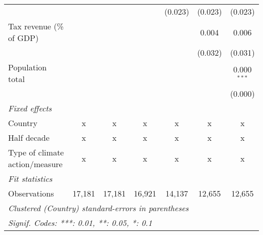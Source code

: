 \begin{tabular}{lcccccc}
                                                     &             &             &             & (0.023)        & (0.023)        & (0.023)\\   
   Tax revenue (\% of GDP)                           &             &             &             &                & 0.004          & 0.006\\   
                                                     &             &             &             &                & (0.032)        & (0.031)\\   
   Population total                                  &             &             &             &                &                & 0.000$^{***}$\\   
                                                     &             &             &             &                &                & (0.000)\\   
   \emph{Fixed effects}\\
   Country                                           & x           & x           & x           & x              & x              & x\\  
   Half decade                                       & x           & x           & x           & x              & x              & x\\  
   Type of climate action/measure                    & x           & x           & x           & x              & x              & x\\  
   \midrule \emph{Fit statistics}\\
   Observations                                      & 17,181      & 17,181      & 16,921      & 14,137         & 12,655         & 12,655\\  
   \midrule
   \multicolumn{7}{l}{\emph{Clustered (Country) standard-errors in parentheses}}\\
   \multicolumn{7}{l}{\emph{Signif. Codes: ***: 0.01, **: 0.05, *: 0.1}}\\
\end{tabular}
\par\endgroup


